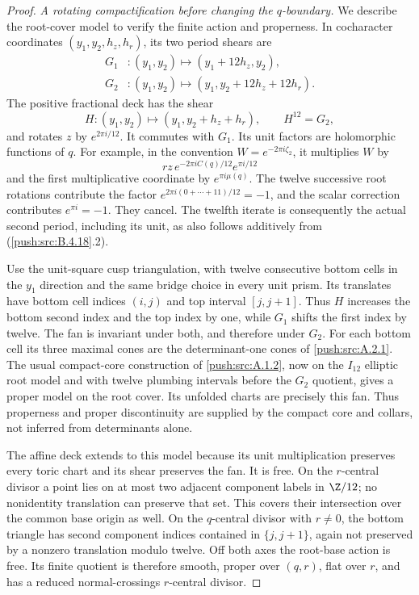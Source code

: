\begin{proof}
\emph{A rotating compactification before changing the
$q$-boundary.}
We describe the root-cover model to verify the finite
action and properness. In cocharacter coordinates
$(y_1,y_2,h_z,h_r)$, its two period shears are
\[
 \begin{aligned}
 G_1 &: (y_1,y_2)\longmapsto(y_1+12h_z,y_2),\\
 G_2 &: (y_1,y_2)\longmapsto
                         (y_1,y_2+12h_z+12h_r).
 \end{aligned}
\]
The positive fractional deck has the shear
\[
 H:(y_1,y_2)\longmapsto(y_1,y_2+h_z+h_r),
 \qquad H^{12}=G_2,
 \tag{B.4.18.5}
\]
and rotates $z$ by $e^{2\pi i/12}$.
It commutes with $G_1$. Its unit factors are holomorphic
functions of $q$. For example, in the convention
$W=e^{-2\pi i\zeta_2}$, it multiplies $W$ by
\[
 r z\,e^{-2\pi i C(q)/12}e^{\pi i/12}
\]
and the first multiplicative coordinate by
$e^{\pi i\mu(q)}$. The twelve successive root rotations
contribute the factor
$e^{2\pi i(0+\cdots+11)/12}=-1$, and the scalar
correction contributes $e^{\pi i}=-1$.
They cancel. The twelfth iterate is consequently
the actual second period, including its unit, as
also follows additively from (\ref{push:src:B.4.18}.2).

Use the unit-square cusp triangulation, with twelve
consecutive bottom cells in the $y_1$ direction and
the same bridge choice in every unit prism. Its
translates have bottom cell indices $(i,j)$ and top
interval $[j,j+1]$. Thus $H$ increases the bottom
second index and the top index by one, while $G_1$
shifts the first index by twelve. The fan is invariant
under both, and therefore under $G_2$.
For each bottom cell its three maximal cones are
the determinant-one cones of \ref{push:src:A.2.1}. The usual
compact-core construction of \ref{push:src:A.1.2}, now on the
$I_{12}$ elliptic root model and with twelve
plumbing intervals before the $G_2$ quotient,
gives a proper model on the root cover. Its
unfolded charts are precisely this fan. Thus
properness and proper discontinuity are supplied
by the compact core and collars, not inferred
from determinants alone.

The affine deck extends to this model because its
unit multiplication preserves every toric chart
and its shear preserves the fan. It is free.
On the $r$-central divisor a point lies on at most
two adjacent component labels in $\Z/12$; no
nonidentity translation can preserve that set.
This covers their intersection over the common
base origin as well. On the $q$-central divisor
with $r\ne0$, the bottom triangle has second
component indices contained in $\{j,j+1\}$,
again not preserved by a nonzero translation
modulo twelve. Off both axes the root-base action
is free. Its finite quotient is therefore smooth,
proper over $(q,r)$, flat over $r$, and has a
reduced normal-crossings $r$-central divisor.


\end{proof}
